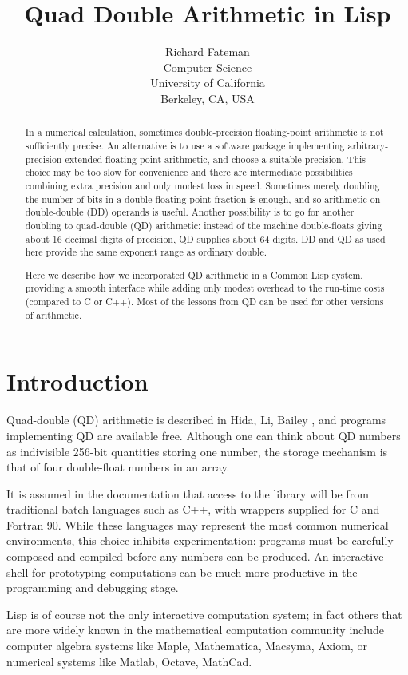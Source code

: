 \documentclass{article}
\title {Quad Double Arithmetic in Lisp}
\author {Richard Fateman\\
Computer Science\\
University of California\\
Berkeley, CA, USA}
\begin{document}
\maketitle
\begin{abstract}
In a numerical calculation,
sometimes double-precision floating-point arithmetic is not
sufficiently precise. An alternative is to
use a software package implementing arbitrary-precision extended
floating-point arithmetic, and choose a suitable precision.
This choice may be too slow for convenience and there are
intermediate possibilities combining extra precision and only
modest loss in speed. Sometimes merely doubling the
number of bits in a double-floating-point fraction is
enough, and so arithmetic on double-double (DD) operands is useful.
Another possibility is to go for another doubling to 
quad-double (QD) arithmetic: instead of the machine double-floats giving
about 16 decimal digits of precision, QD supplies about 64 digits.  DD
and QD as used here provide the same exponent range as ordinary double.

Here we describe how we incorporated QD arithmetic in a Common Lisp system,
providing a smooth interface while adding only modest overhead to the
run-time costs (compared to C or C++). Most of the lessons from QD can be
used for other versions of arithmetic.
\end{abstract} 

\section{Introduction}

Quad-double (QD) arithmetic is described in Hida, Li, Bailey \cite{qd}, and programs
implementing QD are available free. Although one can think about QD
numbers as indivisible 256-bit quantities storing one number, the
storage mechanism is that of four double-float numbers in an array.

It is assumed in the documentation \cite{qd} that access to the
library will be from traditional batch languages such as C++, with
wrappers supplied for C and Fortran 90.  While these languages may
represent the most common numerical environments, this choice inhibits
experimentation: programs must be carefully composed and compiled
before any numbers can be produced. An interactive shell for
prototyping computations can be much more productive in the programming and
debugging stage.

Lisp is of course not the only interactive computation system; in fact
others that are more widely known in the mathematical computation
community include computer algebra systems like Maple, Mathematica,
Macsyma, Axiom, or numerical systems like Matlab, Octave, MathCad.
\end{document}
